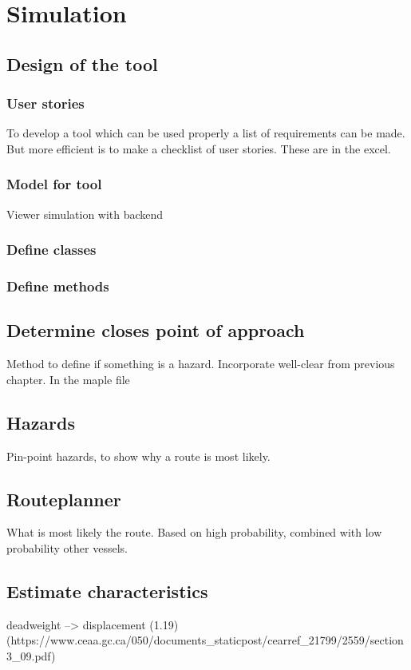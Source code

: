 \chapter{Simulation}

\section{Design of the tool}

\subsection{User stories}
To develop a tool which can be used properly a list of requirements can be made. But more efficient is to make a checklist of user stories. These are in the excel.

\subsection{Model for tool}
Viewer simulation with backend

\subsection{Define classes}

\subsection{Define methods}


\section{Determine closes point of approach}
Method to define if something is a hazard. Incorporate well-clear from previous chapter.
In the maple file

\section{Hazards}
Pin-point hazards, to show why a route is most likely.

\section{Routeplanner}
What is most likely the route. Based on high probability, combined with low probability other vessels.

\section{Estimate characteristics}
deadweight --> displacement (1.19) (https://www.ceaa.gc.ca/050/documents_staticpost/cearref_21799/2559/section3_09.pdf)